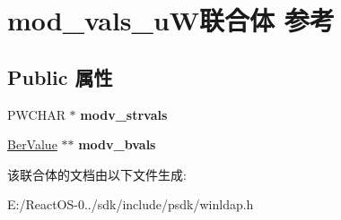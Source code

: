 \hypertarget{unionmod__vals__u_w}{}\section{mod\+\_\+vals\+\_\+u\+W联合体 参考}
\label{unionmod__vals__u_w}
\subsection*{Public 属性}
\begin{DoxyCompactItemize}
\item 
\mbox{\label{unionmod__vals__u_w_ad65fdcc6cbed2b9a014d0fdbda8d50e8}} 
P\+W\+C\+H\+AR $\ast$ {\bfseries modv\+\_\+strvals}
\item 
\mbox{\label{unionmod__vals__u_w_ade163b32399732de86bc9308f2e43030}} 
\hyperlink{structberval}{Ber\+Value} $\ast$$\ast$ {\bfseries modv\+\_\+bvals}
\end{DoxyCompactItemize}


该联合体的文档由以下文件生成\+:\begin{DoxyCompactItemize}
\item 
E\+:/\+React\+O\+S-\/0../sdk/include/psdk/winldap.\+h\end{DoxyCompactItemize}
